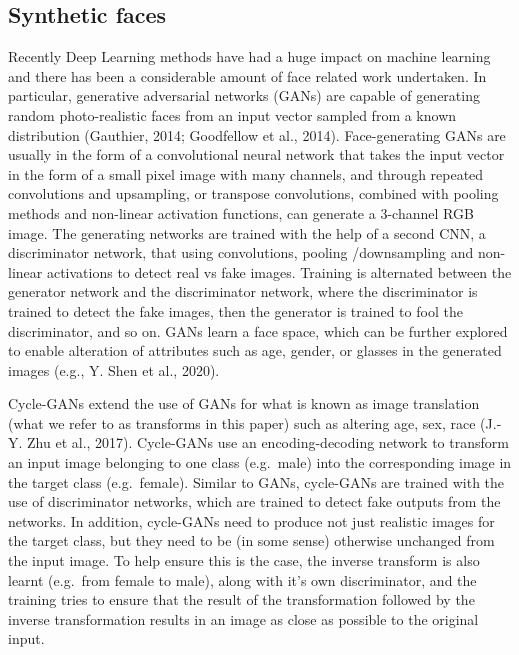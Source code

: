 \documentclass[
  doc,floatsintext]{apa6}
\begin{document}
\hypertarget{synthetic-faces}{%
\subsection{Synthetic faces}\label{synthetic-faces}}

Recently Deep Learning methods have had a huge impact on machine learning and there has been a considerable amount of face related work undertaken. In particular, generative adversarial networks (GANs) are capable of generating random photo-realistic faces from an input vector sampled from a known distribution (Gauthier, 2014; Goodfellow et al., 2014). Face-generating GANs are usually in the form of a convolutional neural network that takes the input vector in the form of a small pixel image with many channels, and through repeated convolutions and upsampling, or transpose convolutions, combined with pooling methods and non-linear activation functions, can generate a 3-channel RGB image. The generating networks are trained with the help of a second CNN, a discriminator network, that using convolutions, pooling /downsampling and non-linear activations to detect real vs fake images. Training is alternated between the generator network and the discriminator network, where the discriminator is trained to detect the fake images, then the generator is trained to fool the discriminator, and so on. GANs learn a face space, which can be further explored to enable alteration of attributes such as age, gender, or glasses in the generated images (e.g., Y. Shen et al., 2020).

Cycle-GANs extend the use of GANs for what is known as image translation (what we refer to as transforms in this paper) such as altering age, sex, race (J.-Y. Zhu et al., 2017). Cycle-GANs use an encoding-decoding network to transform an input image belonging to one class (e.g.~male) into the corresponding image in the target class (e.g.~female). Similar to GANs, cycle-GANs are trained with the use of discriminator networks, which are trained to detect fake outputs from the networks. In addition, cycle-GANs need to produce not just realistic images for the target class, but they need to be (in some sense) otherwise unchanged from the input image. To help ensure this is the case, the inverse transform is also learnt (e.g.~from female to male), along with it's own discriminator, and the training tries to ensure that the result of the transformation followed by the inverse transformation results in an image as close as possible to the original input.
\end{document}
